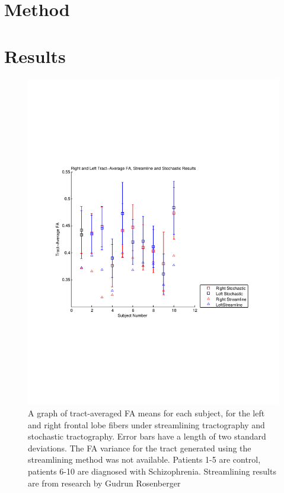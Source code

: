\section{Method}



\section{Results}

\begin{figure} \label{fig:facomp}
	\includegraphics[width=\linewidth]{FAcomp}
	\caption{A graph of tract-averaged FA means for each subject, for the left and right frontal lobe fibers under streamlining tractography and stochastic tractography.  Error bars have a length of two standard deviations.  The FA variance for the tract generated using the streamlining method was not available.  Patients 1-5 are control, patients 6-10 are diagnosed with Schizophrenia. Streamlining results are from research by Gudrun Rosenberger}
\end{figure}


